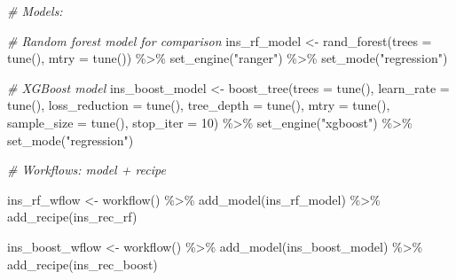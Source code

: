 \documentclass[
]{book}
\newenvironment{Shaded}{\begin{snugshade}}{\end{snugshade}}
\newcommand{\AttributeTok}[1]{\textcolor[rgb]{0.77,0.63,0.00}{#1}}
\newcommand{\CommentTok}[1]{\textcolor[rgb]{0.56,0.35,0.01}{\textit{#1}}}
\newcommand{\DecValTok}[1]{\textcolor[rgb]{0.00,0.00,0.81}{#1}}
\newcommand{\FunctionTok}[1]{\textcolor[rgb]{0.00,0.00,0.00}{#1}}
\newcommand{\NormalTok}[1]{#1}
\newcommand{\OtherTok}[1]{\textcolor[rgb]{0.56,0.35,0.01}{#1}}
\newcommand{\SpecialCharTok}[1]{\textcolor[rgb]{0.00,0.00,0.00}{#1}}
\newcommand{\StringTok}[1]{\textcolor[rgb]{0.31,0.60,0.02}{#1}}
\begin{document}
\begin{Shaded}
\begin{Highlighting}[]
\CommentTok{\# Models:}

\CommentTok{\# Random forest model for comparison}
\NormalTok{ins\_rf\_model }\OtherTok{\textless{}{-}} \FunctionTok{rand\_forest}\NormalTok{(}\AttributeTok{trees =} \FunctionTok{tune}\NormalTok{(),}
                             \AttributeTok{mtry =} \FunctionTok{tune}\NormalTok{()) }\SpecialCharTok{\%\textgreater{}\%} 
  \FunctionTok{set\_engine}\NormalTok{(}\StringTok{"ranger"}\NormalTok{) }\SpecialCharTok{\%\textgreater{}\%} 
  \FunctionTok{set\_mode}\NormalTok{(}\StringTok{"regression"}\NormalTok{)}

\CommentTok{\# XGBoost model}
\NormalTok{ins\_boost\_model }\OtherTok{\textless{}{-}} \FunctionTok{boost\_tree}\NormalTok{(}\AttributeTok{trees =} \FunctionTok{tune}\NormalTok{(),}
                               \AttributeTok{learn\_rate =} \FunctionTok{tune}\NormalTok{(),}
                               \AttributeTok{loss\_reduction =} \FunctionTok{tune}\NormalTok{(),}
                               \AttributeTok{tree\_depth =} \FunctionTok{tune}\NormalTok{(),}
                               \AttributeTok{mtry =} \FunctionTok{tune}\NormalTok{(),}
                               \AttributeTok{sample\_size =} \FunctionTok{tune}\NormalTok{(),}
                               \AttributeTok{stop\_iter =} \DecValTok{10}\NormalTok{) }\SpecialCharTok{\%\textgreater{}\%}
  \FunctionTok{set\_engine}\NormalTok{(}\StringTok{"xgboost"}\NormalTok{) }\SpecialCharTok{\%\textgreater{}\%} 
  \FunctionTok{set\_mode}\NormalTok{(}\StringTok{"regression"}\NormalTok{)}
\end{Highlighting}
\end{Shaded}

\begin{Shaded}
\begin{Highlighting}[]
\CommentTok{\# Workflows: model + recipe}

\NormalTok{ins\_rf\_wflow }\OtherTok{\textless{}{-}}
  \FunctionTok{workflow}\NormalTok{() }\SpecialCharTok{\%\textgreater{}\%}
  \FunctionTok{add\_model}\NormalTok{(ins\_rf\_model) }\SpecialCharTok{\%\textgreater{}\%}
  \FunctionTok{add\_recipe}\NormalTok{(ins\_rec\_rf)}

\NormalTok{ins\_boost\_wflow }\OtherTok{\textless{}{-}}
  \FunctionTok{workflow}\NormalTok{() }\SpecialCharTok{\%\textgreater{}\%}
  \FunctionTok{add\_model}\NormalTok{(ins\_boost\_model) }\SpecialCharTok{\%\textgreater{}\%}
  \FunctionTok{add\_recipe}\NormalTok{(ins\_rec\_boost)}
\end{Highlighting}
\end{Shaded}
\end{document}
